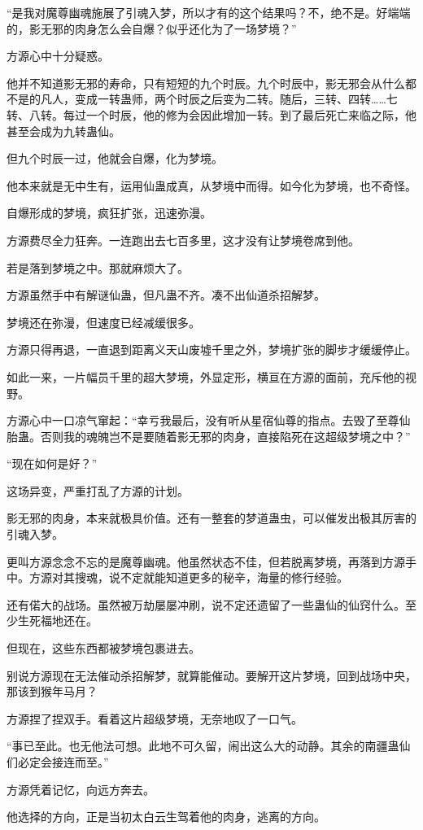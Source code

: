 \begin{this_body}
“是我对魔尊幽魂施展了引魂入梦，所以才有的这个结果吗？不，绝不是。好端端的，影无邪的肉身怎么会自爆？似乎还化为了一场梦境？”

方源心中十分疑惑。

他并不知道影无邪的寿命，只有短短的九个时辰。九个时辰中，影无邪会从什么都不是的凡人，变成一转蛊师，两个时辰之后变为二转。随后，三转、四转……七转、八转。每过一个时辰，他的修为会因此增加一转。到了最后死亡来临之际，他甚至会成为九转蛊仙。

但九个时辰一过，他就会自爆，化为梦境。

他本来就是无中生有，运用仙蛊成真，从梦境中而得。如今化为梦境，也不奇怪。

自爆形成的梦境，疯狂扩张，迅速弥漫。

方源费尽全力狂奔。一连跑出去七百多里，这才没有让梦境卷席到他。

若是落到梦境之中。那就麻烦大了。

方源虽然手中有解谜仙蛊，但凡蛊不齐。凑不出仙道杀招解梦。

梦境还在弥漫，但速度已经减缓很多。

方源只得再退，一直退到距离义天山废墟千里之外，梦境扩张的脚步才缓缓停止。

如此一来，一片幅员千里的超大梦境，外显定形，横亘在方源的面前，充斥他的视野。

方源心中一口凉气窜起：“幸亏我最后，没有听从星宿仙尊的指点。去毁了至尊仙胎蛊。否则我的魂魄岂不是要随着影无邪的肉身，直接陷死在这超级梦境之中？”

“现在如何是好？”

这场异变，严重打乱了方源的计划。

影无邪的肉身，本来就极具价值。还有一整套的梦道蛊虫，可以催发出极其厉害的引魂入梦。

更叫方源念念不忘的是魔尊幽魂。他虽然状态不佳，但若脱离梦境，再落到方源手中。方源对其搜魂，说不定就能知道更多的秘辛，海量的修行经验。

还有偌大的战场。虽然被万劫屡屡冲刷，说不定还遗留了一些蛊仙的仙窍什么。至少生死福地还在。

但现在，这些东西都被梦境包裹进去。

别说方源现在无法催动杀招解梦，就算能催动。要解开这片梦境，回到战场中央，那该到猴年马月？

方源捏了捏双手。看着这片超级梦境，无奈地叹了一口气。

“事已至此。也无他法可想。此地不可久留，闹出这么大的动静。其余的南疆蛊仙们必定会接连而至。”

方源凭着记忆，向远方奔去。

他选择的方向，正是当初太白云生驾着他的肉身，逃离的方向。


\end{this_body}
